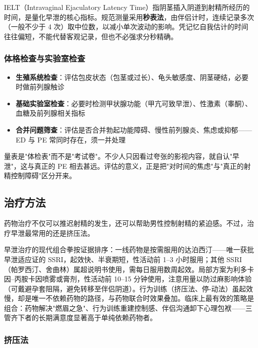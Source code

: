 IELT（Intravaginal Ejaculatory Latency Time）指阴茎插入阴道到射精所经历的时间，是量化早泄的核心指标。规范测量采用\textbf{秒表法}，由伴侣计时，连续记录多次（一般不少于 4 次）取中位数，以减小单次波动的影响。凭记忆自我估计的时间往往偏短，不能代替客观记录，但也不必强求分秒精确。

\subsubsection{体格检查与实验室检查}

\begin{itemize}
	\item \textbf{生殖系统检查}：评估包皮状态（包茎或过长）、龟头敏感度、阴茎硬结，必要时做前列腺触诊
	\item \textbf{基础实验室检查}：必要时检测甲状腺功能（甲亢可致早泄）、性激素（睾酮）、血糖及前列腺相关指标
	\item \textbf{合并问题筛查}：评估是否合并勃起功能障碍、慢性前列腺炎、焦虑或抑郁——ED 与 PE 常同时存在，须一并处理
\end{itemize}

\begin{tcolorbox}[colback=pink!5!white,colframe=red!50!black,title=贴心小叮咛]
量表是"体检表"而不是"考试卷"。不少人只因看过夸张的影视内容，就自认"早泄"，这与真正的 PE 相去甚远。评估的意义，正是把"对时间的焦虑"与"真正的射精控制障碍"区分开来。
\end{tcolorbox}

\subsection{治疗方法}

药物治疗不仅可以推迟射精的发生，还可以帮助男性控制射精的紧迫感。不过，治疗早泄最常用的还是挤压法。


早泄治疗的现代组合拳按证据排序：一线药物是按需服用的达泊西汀——唯一获批早泄适应证的 SSRI，起效快、半衰期短，性活动前 1--3 小时服用；其他 SSRI（帕罗西汀、舍曲林）属超说明书使用，需每日服用数周起效。局部方案为利多卡因--丙胺卡因喷雾或膏剂，性活动前 10--15 分钟使用，注意用量以防过麻影响体验（可戴避孕套阻隔，避免转移至伴侣阴道）。行为训练（挤压法、停-动法）虽起效慢，却是唯一不依赖药物的路径，与药物联合时效果叠加。临床上最有效的策略是组合：药物解决"燃眉之急"、行为训练重建控制感、伴侣沟通卸下心理包袱——三管齐下者的长期满意度显著高于单纯依赖药物者。

\subsubsection{挤压法}

